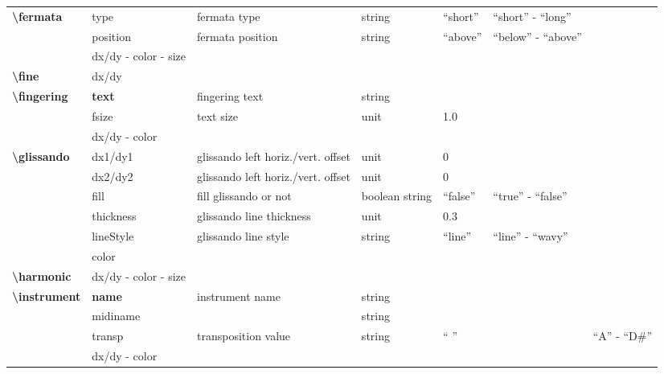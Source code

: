 \documentclass[a4paper, landscape, 10pt]{article}
\begin{document}
\begin{tabularx}{\linewidth}{p{3cm}p{3cm}p{5cm}p{3cm}p{2.5cm}p{3.5cm}p{4cm}}
    \hline
    \textbf{\textbackslash{}fermata}&type&fermata type&string&``short''&``short'' - ``long''&\\
    &position&fermata position&string&``above''&``below'' - ``above''&\\
    &dx/dy - color - size&&&&&\\
    \hline
    \textbf{\textbackslash{}fine}&dx/dy&&&&&\\
    \hline
    \textbf{\textbackslash{}fingering}&\textbf{text}&fingering text&string&&&\\
    &fsize&text size&unit&1.0&&\\
    &dx/dy - color&&&&&\\
    \hline
    \textbf{\textbackslash{}glissando}&dx1/dy1&glissando left horiz./vert. offset&unit&0&&\\
    &dx2/dy2&glissando left horiz./vert. offset&unit&0&&\\
    &fill&fill glissando or not&boolean string&``false''&``true'' - ``false''&\\
    &thickness&glissando line thickness&unit&0.3&&\\
    &lineStyle&glissando line style&string&``line''&``line'' - ``wavy''&\\ %
    &color&&&&&\\
    \hline
	\textbf{\textbackslash{}harmonic}&dx/dy - color - size&&&&&\\
	\hline
    \textbf{\textbackslash{}instrument}&\textbf{name}&instrument name&string&&&\\
    &midiname&&string&&&\\ %
    &transp&transposition value&string&`` ''&&``A'' - ``D\#''\\
    &dx/dy - color&&&&&\\
    \hline
\end{tabularx}
\end{document}
